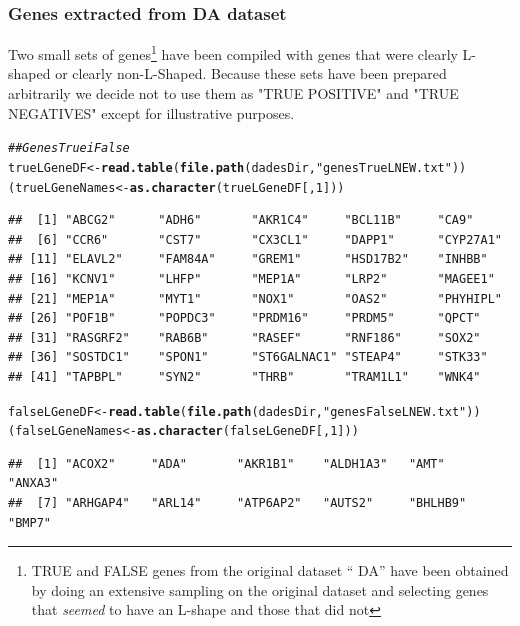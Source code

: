 \documentclass[a4paper,10pt]{article}\usepackage[]{graphicx}\usepackage[]{xcolor}
\makeatletter
\newcommand{\hlnum}[1]{\textcolor[rgb]{0.686,0.059,0.569}{#1}}%
\newcommand{\hlstr}[1]{\textcolor[rgb]{0.192,0.494,0.8}{#1}}%
\newcommand{\hlcom}[1]{\textcolor[rgb]{0.678,0.584,0.686}{\textit{#1}}}%
\newcommand{\hlstd}[1]{\textcolor[rgb]{0.345,0.345,0.345}{#1}}%
\newcommand{\hlkwb}[1]{\textcolor[rgb]{0.69,0.353,0.396}{#1}}%
\newcommand{\hlkwd}[1]{\textcolor[rgb]{0.737,0.353,0.396}{\textbf{#1}}}%
\newenvironment{kframe}{%
 \def\at@end@of@kframe{}%
 \ifinner\ifhmode%
  \def\at@end@of@kframe{\end{minipage}}%
  \begin{minipage}{\columnwidth}%
 \fi\fi%
 \def\FrameCommand##1{\hskip\@totalleftmargin \hskip-\fboxsep
 \colorbox{shadecolor}{##1}\hskip-\fboxsep
     \hskip-\linewidth \hskip-\@totalleftmargin \hskip\columnwidth}%
 \MakeFramed {\advance\hsize-\width
   \@totalleftmargin\z@ \linewidth\hsize
   \@setminipage}}%
 {\par\unskip\endMakeFramed%
 \at@end@of@kframe}
\newenvironment{knitrout}{}{} %
\makeatother
\begin{document}
\subsubsection{Genes extracted from DA dataset}

Two small sets of genes\footnote{TRUE and FALSE genes from the original dataset `` DA'' have been obtained by doing an extensive  sampling on the original dataset and selecting genes that \emph{seemed} to have an L-shape and those that did not} have been compiled with genes that were clearly L-shaped or clearly non-L-Shaped. Because these sets have been prepared arbitrarily we decide not to use them as "TRUE POSITIVE" and "TRUE NEGATIVES" except for illustrative purposes.

\begin{knitrout}
\color{fgcolor}\begin{kframe}
\begin{alltt}
\hlcom{## Genes True i False}
\hlstd{trueLGeneDF} \hlkwb{<-}\hlkwd{read.table}\hlstd{(}\hlkwd{file.path}\hlstd{(dadesDir,} \hlstr{"genesTrueLNEW.txt"}\hlstd{))}
\hlstd{(trueLGeneNames} \hlkwb{<-} \hlkwd{as.character}\hlstd{(trueLGeneDF[,}\hlnum{1}\hlstd{]))}
\end{alltt}
\begin{verbatim}
##  [1] "ABCG2"      "ADH6"       "AKR1C4"     "BCL11B"     "CA9"       
##  [6] "CCR6"       "CST7"       "CX3CL1"     "DAPP1"      "CYP27A1"   
## [11] "ELAVL2"     "FAM84A"     "GREM1"      "HSD17B2"    "INHBB"     
## [16] "KCNV1"      "LHFP"       "MEP1A"      "LRP2"       "MAGEE1"    
## [21] "MEP1A"      "MYT1"       "NOX1"       "OAS2"       "PHYHIPL"   
## [26] "POF1B"      "POPDC3"     "PRDM16"     "PRDM5"      "QPCT"      
## [31] "RASGRF2"    "RAB6B"      "RASEF"      "RNF186"     "SOX2"      
## [36] "SOSTDC1"    "SPON1"      "ST6GALNAC1" "STEAP4"     "STK33"     
## [41] "TAPBPL"     "SYN2"       "THRB"       "TRAM1L1"    "WNK4"
\end{verbatim}
\begin{alltt}
\hlstd{falseLGeneDF} \hlkwb{<-} \hlkwd{read.table}\hlstd{(}\hlkwd{file.path}\hlstd{(dadesDir,} \hlstr{"genesFalseLNEW.txt"}\hlstd{))}
\hlstd{(falseLGeneNames} \hlkwb{<-} \hlkwd{as.character}\hlstd{(falseLGeneDF[,}\hlnum{1}\hlstd{]))}
\end{alltt}
\begin{verbatim}
##  [1] "ACOX2"     "ADA"       "AKR1B1"    "ALDH1A3"   "AMT"       "ANXA3"    
##  [7] "ARHGAP4"   "ARL14"     "ATP6AP2"   "AUTS2"     "BHLHB9"    "BMP7"     

\end{verbatim}
\end{kframe}
\end{knitrout}
\end{document}

